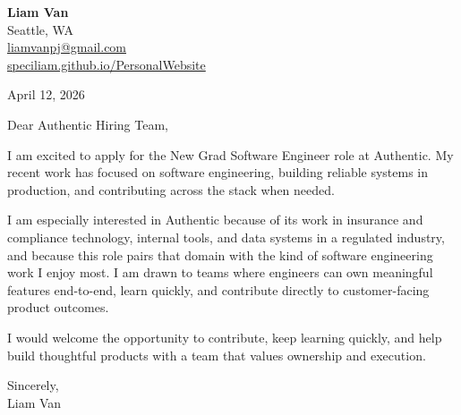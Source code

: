 \documentclass[letterpaper,11pt]{article}
\begin{document}
\begin{flushleft}
\textbf{\Large Liam Van} \\
Seattle, WA \\
\href{mailto:liamvanpj@gmail.com}{liamvanpj@gmail.com} \\
\href{https://speciliam.github.io/PersonalWebsite}{speciliam.github.io/PersonalWebsite}
\end{flushleft}

April 12, 2026

\noindent Dear Authentic Hiring Team,

\noindent I am excited to apply for the New Grad Software Engineer role at Authentic. My recent work has focused on software engineering, building reliable systems in production, and contributing across the stack when needed.

\noindent I am especially interested in Authentic because of its work in insurance and compliance technology, internal tools, and data systems in a regulated industry, and because this role pairs that domain with the kind of software engineering work I enjoy most. I am drawn to teams where engineers can own meaningful features end-to-end, learn quickly, and contribute directly to customer-facing product outcomes.

\noindent I would welcome the opportunity to contribute, keep learning quickly, and help build thoughtful products with a team that values ownership and execution.

\noindent Sincerely, \\
Liam Van
\end{document}
